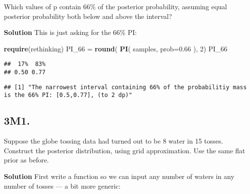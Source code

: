 \documentclass[
]{book}
\newenvironment{Shaded}{\begin{snugshade}}{\end{snugshade}}
\newcommand{\DataTypeTok}[1]{\textcolor[rgb]{0.13,0.29,0.53}{#1}}
\newcommand{\DecValTok}[1]{\textcolor[rgb]{0.00,0.00,0.81}{#1}}
\newcommand{\FloatTok}[1]{\textcolor[rgb]{0.00,0.00,0.81}{#1}}
\newcommand{\KeywordTok}[1]{\textcolor[rgb]{0.13,0.29,0.53}{\textbf{#1}}}
\newcommand{\NormalTok}[1]{#1}
\newcommand{\StringTok}[1]{\textcolor[rgb]{0.31,0.60,0.02}{#1}}
\begin{document}
Which values of p contain 66\% of the posterior probability, assuming equal posterior probability both below and above the interval?

\textbf{Solution}
This is just asking for the 66\% PI:

\begin{Shaded}
\begin{Highlighting}[]
\KeywordTok{require}\NormalTok{(rethinking)}
\NormalTok{PI_}\DecValTok{66}\NormalTok{ =}\StringTok{ }\KeywordTok{round}\NormalTok{( }\KeywordTok{PI}\NormalTok{( samples, }\DataTypeTok{prob=}\FloatTok{0.66}\NormalTok{ ), }\DecValTok{2}\NormalTok{)}
\NormalTok{PI_}\DecValTok{66}
\end{Highlighting}
\end{Shaded}

\begin{verbatim}
##  17%  83% 
## 0.50 0.77
\end{verbatim}

\begin{Shaded}
\end{Shaded}

\begin{verbatim}
## [1] "The narrowest interval containing 66% of the probabilitiy mass is the 66% PI: [0.5,0.77], (to 2 dp)"
\end{verbatim}

\hypertarget{m1.}{%
\subsection{3M1.}\label{m1.}}

Suppose the globe tossing data had turned out to be 8 water in 15 tosses. Construct the posterior distribution, using grid approximation. Use the same flat prior as before.

\textbf{Solution}
First write a function so we can input any number of waters in any number of tosses --- a bit more generic:
\end{document}
